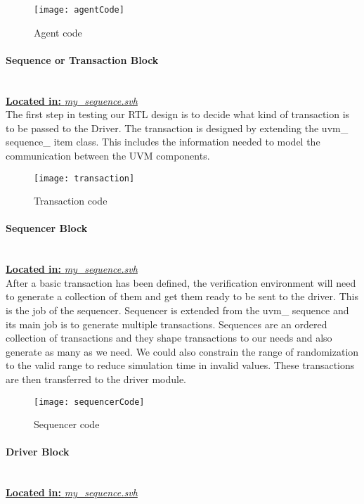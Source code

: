 \documentclass[a4paper,11pt]{article}
\begin{document}
\begin{figure}[ht]
\centering
\texttt{[image: agentCode]}
\caption{Agent code}
\end{figure}


\FloatBarrier
\paragraph{Sequence or Transaction Block}\mbox{}\\
\underline{\textbf{Located in:} \textit{my\_sequence.svh}}\\

The first step in testing our RTL design is to decide what kind of transaction is to be passed to the Driver. The transaction is designed by extending the uvm\_ sequence\_ item class. This includes the information needed to model the communication between the UVM components.

\begin{figure}[ht]
\centering
\texttt{[image: transaction]}
\caption{Transaction code}
\end{figure}

\FloatBarrier
\paragraph{Sequencer Block}\mbox{}\\
\underline{\textbf{Located in:} \textit{my\_sequence.svh}}\\

After a basic transaction has been defined, the verification environment will need to generate a collection of them and get them ready to be sent to the driver. This is the job of the sequencer. Sequencer is extended from the uvm\_ sequence and its main job is to generate multiple transactions. Sequences are an ordered collection of transactions and they shape transactions to our needs and also generate as many as we need. We could also constrain the range of randomization to the valid range to reduce simulation time in invalid values. 
These transactions are then transferred to the driver module.

\begin{figure}[ht]
\centering
\texttt{[image: sequencerCode]}
\caption{Sequencer code}
\end{figure}

\FloatBarrier
\paragraph{Driver Block}\mbox{}\\
\underline{\textbf{Located in:} \textit{my\_sequence.svh}}\\
\end{document}
